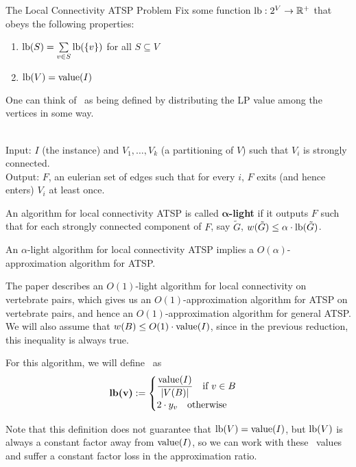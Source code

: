 \documentclass[./main.tex]{subfiles}
\begin{document}
\DeclarePairedDelimiter\ceil{\lceil}{\rceil}
\DeclarePairedDelimiter\floor{\lfloor}{\rfloor}

\begin{subsection}{The Local Connectivity ATSP Problem}
	Fix some function $\textup{lb} : 2^V\rightarrow \mathbb{R}^+$ that obeys the following properties:
	\begin{enumerate}
		\item $\textup{lb}(S) = \sum\limits_{v\in S}\textup{lb}(\{v\})$ for all $S\subseteq V$
		\item $\textup{lb}(V) = \textup{value}(I)$
	\end{enumerate}
	One can think of \lb\ as being defined by distributing the LP value among the vertices in some way.\vspace{3mm}
	\begin{problem}
	\ \\Input: $I$ (the instance) and $V_1,\ldots,V_k$ (a partitioning of $V$) such that $V_i$ is strongly connected.
	\\Output: $F$, an eulerian set of edges such that for every $i$, $F$ exits (and hence enters) $V_i$ at least once.\end{problem}\vspace{4mm}
	\begin{definition}
		An algorithm for local connectivity ATSP is called $\bm{\alpha}$\textbf{-light} if it outputs $F$ such that for each strongly connected component of $F$, say $\tilde{G}$, $w(\tilde{G})\leq \alpha\cdot \textup{lb}(\tilde{G})$.
	\end{definition}\vspace{2mm}
	\begin{theorem}[Svensson '15] An $\alpha$-light algorithm for local connectivity ATSP implies a $O(\alpha)$-approximation algorithm for ATSP.
	\end{theorem}
	The paper describes an $O(1)$-light algorithm for local connectivity on vertebrate pairs, which gives us an $O(1)$-approximation algorithm for ATSP on vertebrate pairs, and hence an $O(1)$-approximation algorithm for general ATSP.\vspace{2mm}
	\\We will also assume that $w(B)\leq O(1)\cdot \textup{value}(I)$, since in the previous reduction, this inequality is always true.
	\begin{definition}
		For this algorithm, we will define \lb\ as $$\textbf{\textup{lb}(v)}:=
		\begin{cases}
			\dfrac{\textup{value}(I)}{|V(B)|}\quad \text{if }v\in B \\
			2\cdot y_v\quad \text{otherwise}
		\end{cases}$$
	\end{definition}
	Note that this definition does not guarantee that $\textup{lb}(V) = \textup{value}(I)$, but $\textup{lb}(V)$ is always a constant factor away from $\textup{value}(I)$, so we can work with these \lb\ values and suffer a constant factor loss in the approximation ratio.\vspace{2mm}
	\end{subsection}
\end{document}
